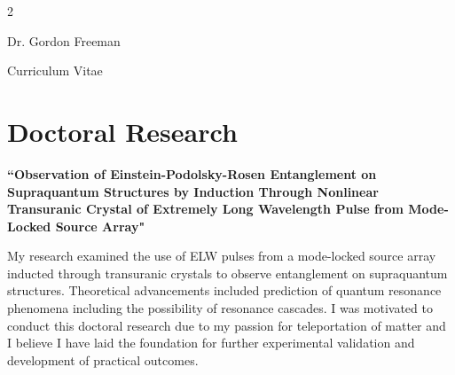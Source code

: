 \documentclass[
	10pt, %
]{FreemanCV}
\begin{document}
\begin{paracol}{2} %


\parbox[][0.11\textheight][c]{\linewidth}{ %
	\centering %
	
	{\sffamily\Huge Dr. Gordon Freeman} %
	
	\medskip %
	
	{\cursivefont\Huge\textcolor{headings}{Curriculum Vitae}}
	
	\vfill %
}


\section{Doctoral Research}

{\raggedright\textbf{``Observation of Einstein-Podolsky-Rosen Entanglement on Supraquantum Structures by Induction Through Nonlinear Transuranic Crystal of Extremely Long Wavelength Pulse from Mode-Locked Source Array"}\par}

\medskip %

My research examined the use of ELW pulses from a mode-locked source array inducted through transuranic crystals to observe entanglement on supraquantum structures. Theoretical advancements included prediction of quantum resonance phenomena including the possibility of resonance cascades. I was motivated to conduct this doctoral research due to my passion for teleportation of matter and I believe I have laid the foundation for further experimental validation and development of practical outcomes.

\medskip %



\end{paracol}
\end{document}
